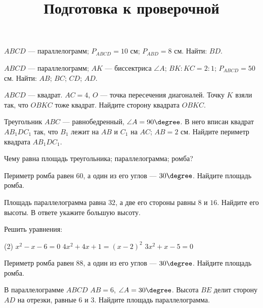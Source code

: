 \begin{class}[number=7]
	\title{Подготовка к проверочной}
	\begin{listofex}
		\item \( ABCD \) --- параллелограмм; \( P_{ABCD}=10 \) см; \( P_{ABD}=8 \)  см. Найти: \( BD \).
		\item \( ABCD \) --- параллелограмм; \( AK \) --- биссектриса \( \angle A \); \( BK:KC=2:1 \); \( P_{ABCD}=50 \) см. Найти: \( AB \); \( BC \); \( CD \); \( AD \).
		\item \( ABCD \) --- квадрат. \( AC=4 \), \( O \) --- точка пересечения диагоналей. Точку \( K \) взяли так, что \( OBKC \) тоже квадрат. Найдите сторону квадрата \( OBKC. \)
		\item Треугольник \( ABC \) --- равнобедренный, \( \angle A=90\degree \). В него вписан квадрат \( AB_1DC_1 \) так, что \( B_1 \) лежит на \( AB \) и \( C_1 \) на \( AC \); \( AB = 2 \) см. Найдите периметр квадрата \( AB_1DC_1  \).
		\item Чему равна площадь треугольника; параллелограмма; ромба?
		\item Периметр ромба равен \( 60 \), а один из его углов --- \( 30\degree \). Найдите площадь ромба.
		\item Площадь параллелограмма равна \( 32 \), а две его стороны равны \( 8 \) и \( 16 \). Найдите его высоты. В ответе укажите большую высоту.
		\item Решить уравнения:
		\begin{tasks}(2)
			\task \( x^2-x-6=0 \)
			\task \( 4x^2+4x+1=(x-2)^2 \)
			\task \( 3x^2+x-5=0 \)
		\end{tasks}
		\item {}
	\end{listofex}
\end{class}

\begin{exam}
	\begin{listofex}
		\item Периметр ромба равен \( 88 \), а один из его углов --- \( 30\degree \). Найдите площадь ромба.
		\item В параллелограмме \( ABCD \) \( AB=6 \), \( \angle A=30\degree \). Высота \( BE \) делит сторону \( AD \) на отрезки, равные \( 6 \) и \( 3 \). Найдите площадь параллелограмма.
	\end{listofex}
\end{exam}
